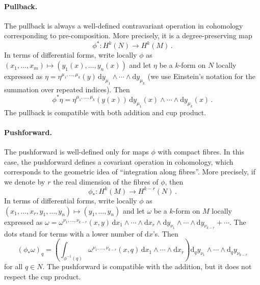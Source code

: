 \documentclass[11pt,reqno]{amsart}
\numberwithin{equation}{section}
\newcommand{\dd}{\mathrm{d}}
\theoremstyle{plain}
\theoremstyle{definition}
\begin{document}
\paragraph{Pullback.} The pullback is always a well-defined contravariant operation in cohomology corresponding to pre-composition. More precisely, it is a degree-preserving map
\begin{equation}
  \phi^* \colon H^k(N) \longrightarrow H^k(M) \,.
\end{equation}
In terms of differential forms, write locally $\phi$ as $(x_1,\ldots,x_m) \mapsto (y_1(x),\ldots,y_n(x))$ and let $\eta$ be a $k$-form on $N$ locally expressed as $\eta = \eta^{\mu_1,\dots,\mu_k}(y) \, \dd y_{\mu_1} \wedge \cdots \wedge \dd y_{\mu_k}$ (we use Einstein's notation for the summation over repeated indices). Then
\begin{equation}
  \phi^* \eta
  =
  \eta^{\mu_1,\dots,\mu_k}(y(x)) \, \dd y_{\mu_1}(x) \wedge \cdots \wedge \dd y_{\mu_k}(x) \,.
\end{equation}
The pullback is compatible with both addition and cup product.

\paragraph{Pushforward.} The pushforward is well-defined only for maps $\phi$ with compact fibres. In this case, the pushforward defines a covariant operation in cohomology, which corresponds to the geometric idea of ``integration along fibres''. More precisely, if we denote by $r$ the real dimension of the fibres of $\phi$, then
\begin{equation}
  \phi_* \colon H^k(M) \longrightarrow H^{k-r}(N) \,.
\end{equation}
In terms of differential forms, write locally $\phi$ as $(x_1,\ldots,x_r,y_1,\ldots,y_n) \mapsto (y_1,\ldots,y_n)$ and let $\omega$ be a $k$-form on $M$ locally expressed as $\omega = \omega^{\nu_1,\dots,\nu_{k-r}}(x,y) \, \dd x_{1} \wedge \cdots \wedge \dd x_{r} \wedge \dd y_{\nu_1} \wedge \cdots \wedge \dd y_{\nu_{k-r}} + \cdots$. The dots stand for terms with a lower number of $\dd x$'s. Then
\begin{equation}
  (\phi_* \omega)_{q}
  =
  \left( \int_{\phi^{-1}(q)} \omega^{\nu_1,\dots,\nu_{k-r}}(x,q) \, \dd x_{1} \wedge \cdots \wedge \dd x_{r} \right)
  \dd_q y_{\nu_1} \wedge \cdots \wedge \dd_q y_{\nu_{k-r}}
\end{equation}
for all $q \in N$. The pushforward is compatible with the addition, but it does not respect the cup product.
\end{document}
